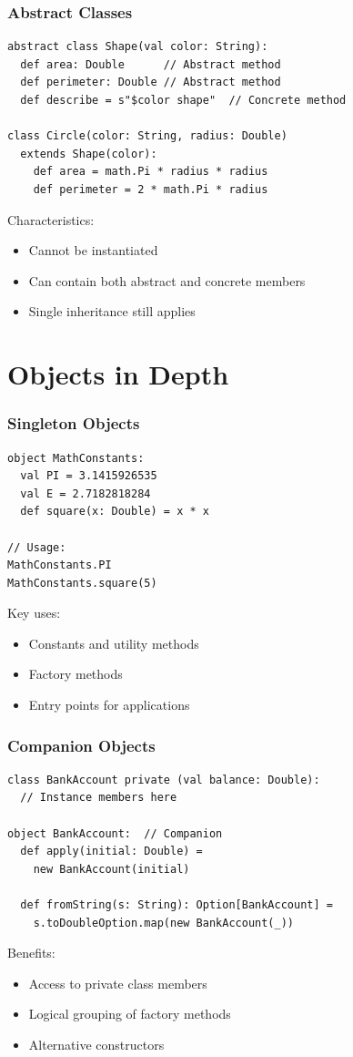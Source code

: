 \documentclass{beamer}
\begin{document}
\begin{frame}[fragile]
\frametitle{Abstract Classes}
\begin{lstlisting}[style=scala]
abstract class Shape(val color: String):
  def area: Double      // Abstract method
  def perimeter: Double // Abstract method
  def describe = s"$color shape"  // Concrete method

class Circle(color: String, radius: Double) 
  extends Shape(color):
    def area = math.Pi * radius * radius
    def perimeter = 2 * math.Pi * radius
\end{lstlisting}

Characteristics:
\begin{itemize}
\item Cannot be instantiated
\item Can contain both abstract and concrete members
\item Single inheritance still applies
\end{itemize}
\end{frame}

\section{Objects in Depth}
\begin{frame}[fragile]
\frametitle{Singleton Objects}
\begin{lstlisting}[style=scala]
object MathConstants:
  val PI = 3.1415926535
  val E = 2.7182818284
  def square(x: Double) = x * x

// Usage:
MathConstants.PI
MathConstants.square(5)
\end{lstlisting}

Key uses:
\begin{itemize}
\item Constants and utility methods
\item Factory methods
\item Entry points for applications
\end{itemize}
\end{frame}

\begin{frame}[fragile]
\frametitle{Companion Objects}
\begin{lstlisting}[style=scala]
class BankAccount private (val balance: Double):
  // Instance members here

object BankAccount:  // Companion
  def apply(initial: Double) = 
    new BankAccount(initial)
    
  def fromString(s: String): Option[BankAccount] = 
    s.toDoubleOption.map(new BankAccount(_))
\end{lstlisting}

Benefits:
\begin{itemize}
\item Access to private class members
\item Logical grouping of factory methods
\item Alternative constructors
\end{itemize}
\end{frame}
\end{document}

